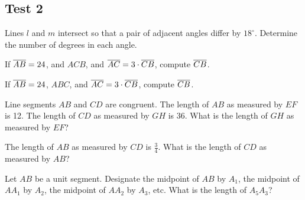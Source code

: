 \documentclass[11pt]{book}
\begin{document}
\subsection*{Test 2}
\begin{exlist}
\item Lines $l$ and $m$ intersect so that a pair of adjacent angles differ by
  $18^\circ$. Determine the number of degrees in each angle.
\item If $\overline{AB} = 24$, and $ACB$, and $\overline{AC} = 3 \cdot \overline{CB}$, compute
  $\overline{CB}$.
\item If $\overline{AB} = 24$, $ABC$, and $\overline{AC} = 3 \cdot \overline{CB}$, compute
  $\overline{CB}$.
\item Line segments $AB$ and $CD$ are congruent. The length of $AB$ as measured
  by $EF$ is 12. The length of $CD$ as measured by $GH$ is 36. What is the
  length of $GH$ as measured by $EF$?
\item The length of $AB$ as measured by $CD$ is $\tfrac{3}{4}$. What is the
  length of $CD$ as measured by $AB$?
\item Let $AB$ be a unit segment. Designate the midpoint of $AB$ by $A_1$, the
  midpoint of $AA_1$ by $A_2$, the midpoint of $AA_2$ by $A_3$, etc. What is
  the length of $A_5A_3$?
\end{exlist}
\end{document}
